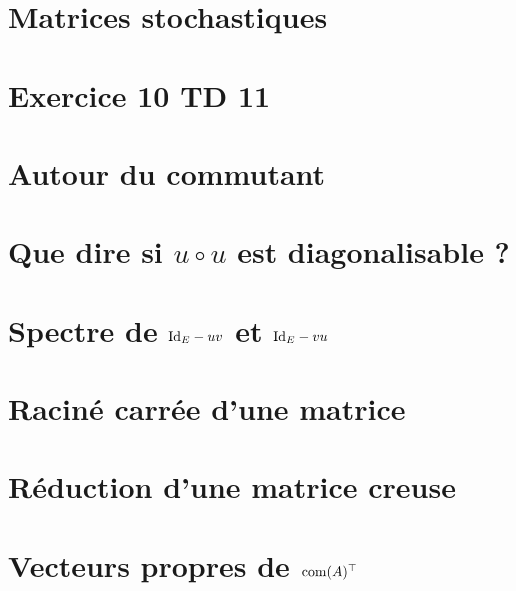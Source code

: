 \section{Matrices stochastiques}


\section{Exercice 10 TD 11}


\section{Autour du commutant}


\section{Que dire si \texorpdfstring{$u \circ u$}{u^2} est diagonalisable ?}


\section{Spectre de \texorpdfstring{$\mathrm{Id}_E-uv$ et $\mathrm{Id}_E-vu$}{IdE-uv et IdE - vu}} \label{spectre_I-uv_et_I-vu}


\section{Raciné carrée d'une matrice}


\section{Réduction d'une matrice creuse}


\section{Vecteurs propres de $\mathrm{com}(A)^\top$}


